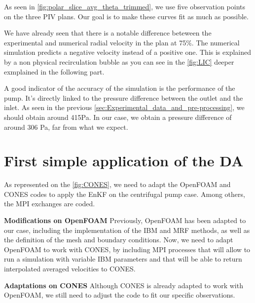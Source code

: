 As seen in \autoref{fig:polar_slice_avg_theta_trimmed}, we use five observation points on the three PIV plans.
Our goal is to make these curves fit as much as possible.


We have already seen that there is a notable difference beteween the experimental and numerical radial velocity in the plan at 75\%. The numerical simulation predicts a negative velocity instead of a positive one. This is explained by a non physical recirculation bubble as you can see in the \autoref{fig:LIC} deeper exmplained in the following part. %

A good indicator of the accuracy of the simulation is the performance of the pump. It's directly linked to the pressure difference between the outlet and the inlet. As seen in the previous \autoref{sec:Experimental_data_and_pre-processing}, we should obtain around 415Pa. In our case, we obtain a pressure difference of around 306 Pa, far from what we expect.






\section{First simple application of the DA}
\label{sec:Application_of_the_DA}

As represented on the \autoref{fig:CONES}, we need to adapt the OpenFOAM and CONES codes to apply the EnKF on the centrifugal pump case. Among others, the MPI exchanges are coded.

\textbf{Modifications on OpenFOAM}
Previously, OpenFOAM has been adapted to our case, including the implementation of the IBM and MRF methods, as well as the definition of the mesh and boundary conditions. Now, we need to adapt OpenFOAM to work with CONES, by including MPI processes that will allow to run a simulation with variable IBM parameters and that will be able to return interpolated averaged velocities to CONES.

\textbf{Adaptations on CONES}
Although CONES is already adapted to work with OpenFOAM, we still need to adjust the code to fit our specific observations.

